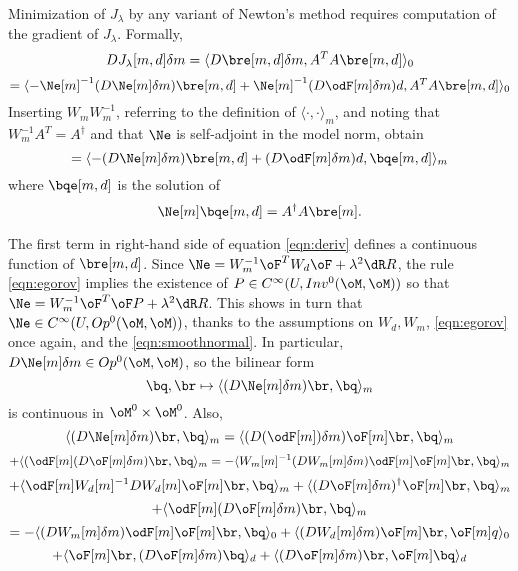 Minimization of $J_{\lambda}$ 
by any variant of Newton's method requires computation of the gradient  
of $J_{\lambda}$. Formally,
\[
DJ_{\lambda}[m,d]\delta m = \langle D\bre[m,d]\delta m,A^TA\bre[m,d]\rangle_0
\]
\[
= \langle -\Ne[m]^{-1}(D\Ne[m]\delta m) \bre[m,d]
+ \Ne[m]^{-1}(D\odF[m]\delta m)d ,A^TA\bre[m,d]\rangle_0
\]
Inserting $W_mW_m^{-1}$, referring to the definition of $\langle
\cdot,\cdot \rangle_m$, and noting that $W_m^{-1}A^T = A^{\dagger}$
and that $\Ne$ is self-adjoint in the model norm, obtain
\begin{equation}
\label{eqn:deriv}
= \langle -(D\Ne[m]\delta m)\bre[m,d] +(D\odF[m]\delta m)d, \bqe[m,d] \rangle_m
\end{equation}
where $\bqe[m,d]$ is the solution of
\begin{equation}
\label{eqn:q}
\Ne[m] \bqe[m,d] = A^{\dagger}A\bre[m].
\end{equation}

The first term in right-hand side of equation \ref{eqn:deriv}  defines
a continuous function of $\bre[m,d]$. 
Since $\Ne = W_m^{-1}\oF^TW_d\oF + \lambda^2 \dR R$, the rule \ref{eqn:egorov} implies
the existence of $P \in C^{\infty}(U,Inv^0(\oM,\oM))$ so that $\Ne =
W_m^{-1}\oF^T\oF P + \lambda^2 \dR R$. This shows in turn that $\Ne \in
C^{\infty}(U,Op^0(\oM,\oM))$, thanks to the assumptions on $W_d, W_m$,
\ref{eqn:egorov} once again, and the \ref{eqn:smoothnormal}. In
particular,
$D\Ne[m]\delta m \in Op^0(\oM,\oM)$, so the bilinear form 
\begin{equation}
\label{eqn:norcont}
\bq, \br \mapsto \langle (D\Ne[m]\delta m)\br,\bq \rangle_m
\end{equation}
is continuous in $\oM^0 \times \oM^0$. Also,
\[
\langle (D\Ne[m]\delta m)\br,\bq\rangle_m=
\langle (D(\odF[m])\delta m)\oF[m]\br,\bq \rangle_m
\]
\[
+\langle(\odF[m] (D\oF[m]\delta m)\br,\bq \rangle _m
= -\langle W_m[m]^{-1}(DW_m[m]\delta m)\odF[m]\oF[m]\br,\bq\rangle_m
\]
\[
+ \langle \odF[m] W_d[m]^{-1}DW_d[m]\oF[m]\br,\bq\rangle_m
+ \langle (D\oF[m]\delta m)^{\dagger}\oF[m]\br,\bq \rangle_m
\]
\[
+ \langle \odF[m](D\oF[m]\delta m)\br,\bq \rangle_m
\]
\[
= -\langle (DW_m[m]\delta m)\odF[m]\oF[m]\br,\bq\rangle_0
+ \langle (DW_d[m]\delta m)\oF[m]\br,\oF[m]q \rangle_0
\]
\begin{equation}
\label{eqn:firstterm}
+ \langle \oF[m]\br,(D\oF[m]\delta m) \bq \rangle_d
+ \langle (D\oF[m]\delta m)\br,\oF[m]\bq \rangle_d
\end{equation}

